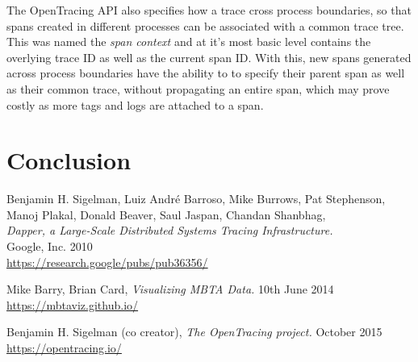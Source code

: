 \documentclass[12pt,pdftex,titlepage]{report}
\begin{document}
        The OpenTracing API also specifies how a trace cross process boundaries, so that spans created in different processes can be
        associated with a common trace tree. This was named the \textit{span context} and at it's most basic level contains the 
        overlying trace ID as well as the current span ID. With this, new spans generated across process boundaries have the ability to
        to specify their parent span as well as their common trace, without propagating an entire span, which may prove costly as more
        tags and logs are attached to a span.
    
    
    \chapter{Conclusion}
    
    \begin{thebibliography}{69}

        Benjamin H. Sigelman, Luiz André Barroso, Mike Burrows, Pat Stephenson, Manoj Plakal, Donald Beaver, Saul Jaspan, Chandan Shanbhag, \\
        \textit{Dapper, a Large-Scale Distributed Systems Tracing Infrastructure.} \\
        Google, Inc. 2010 \\
        \url{https://research.google/pubs/pub36356/}

        Mike Barry, Brian Card, \textit{Visualizing MBTA Data.}
        10th June 2014 \\
        \url{https://mbtaviz.github.io/}

        Benjamin H. Sigelman (co creator), \textit{The OpenTracing project.}
        October 2015 \\
        \url{https://opentracing.io/}
    \end{thebibliography}
\end{document}
